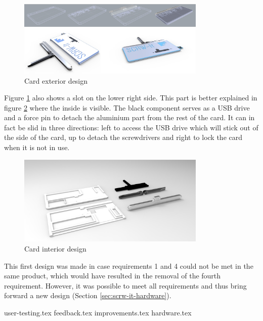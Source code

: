 \documentclass[final,a4paper]{report} %
\begin{document}
	\begin{figure}[H]
		\centering
		\includegraphics[width=0.8\textwidth]{resources/CardDesign1}
		\caption{Card exterior design}
		\label{fig:CardExteriorDesign}
	\end{figure}
	
	Figure \ref{fig:CardExteriorDesign} also shows a slot on the lower right side. This part is better explained in figure \ref{fig:CardInteriorDesign} where the inside is visible. The black component serves as a USB drive and a force pin to detach the aluminium part from the rest of the card. It can in fact be slid in three directions: left to access the USB drive which will stick out of the side of the card, up to detach the screwdrivers and right to lock the card when it is not in use. 
	
	\begin{figure}[H]
		\centering
		\includegraphics[width=0.8\textwidth]{resources/CardDesign2}
		\caption{Card interior design}
		\label{fig:CardInteriorDesign}
	\end{figure}
	
	This first design was made in case requirements 1 and 4 could not be met in the same product, which would have resulted in the removal of the fourth requirement. However, it was possible to meet all requirements and thus bring forward a new design (Section \ref{sec:scrw-it-hardware}).
	
	{user-testing.tex}
	{feedback.tex}
	{improvements.tex}
	{hardware.tex}
\end{document}
